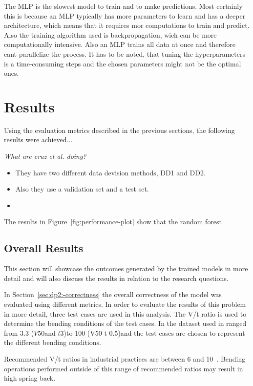 The \ac{MLP} is the slowest model to train and to make predictions.
Most certainly this is because an \ac{MLP} typically has more parameters to learn and
has a deeper architecture, which means that it requires mor computations to train and
predict.
Also the training algorithm used is backpropagation, wich can be more computationally
intensive.
Also an \ac{MLP} trains all data at once and therefore cant parallelize the process.
It has to be noted, that tuning the hyperparameters is a time-consuming steps and the
chosen parameters might not be the optimal ones.


\section{Results}\label{sec:overall-results}
Using the evaluation metrics described in the previous sections, the
following results were
achieved...

\textit{What are cruz et al. doing?}
\begin{itemize}
    \item They have two different data devision methods, DD1 and DD2.
    \item Also they use a validation set and a test set.
    \item
\end{itemize}

The results in Figure~\ref{fig:performance-plot} show that the random forest

\subsection{Overall Results}\label{subsec:overall-results}
This section will showcase the outcomes generated by the trained models in more detail and
will also discuss the results in relation to the research questions.

In Section~\ref{sec:dp2:-correctness} the overall correctness of the model was
evaluated using different metrics.
In order to evaluate the results of this problem in more detail, three test cases are used
in this analysis.
The V/t ratio is used to determine the bending conditions of the test cases. In the
dataset used in ranged from 3.3 (\(V 50\)and \(t 3\))to 100 (V50 t 0.5)and the test
cases are chosen to represent the different bending conditions.

Recommended V/t ratios in industrial practices are between 6 and 10~\cite[p.7]{
    cruz_applicationmachinelearning_2021}.
Bending operations performed outside of this range of recommended ratios may result in
high spring back.

